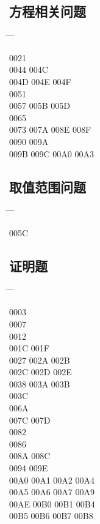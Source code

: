 \documentclass[twoside, twocolumn]{ctexart}
\newenvironment{problist}{
  \begin{center} \ttfamily \begin{tabbing}
      \hspace{50pt} \= \hspace{50pt} \= \hspace{50pt} \= \kill
  }{ \end{tabbing} \end{center} }
\begin{document}
  \subsection*{方程相关问题}

  \begin{problist}
    0021    \\ 0044   \> 004C \\
    004D \> 004E \> 004F  \\ 0051    \\
    0057 \> 005B \> 005D  \\ 0065    \\
    0073 \> 007A \> 008E \> 008F \\ 0090   \> 009A \\
    009B \> 009C \> 00A0 \> 00A3 \\
  \end{problist}

  \subsection*{取值范围问题}

  \begin{problist}
    005C   \\
  \end{problist}

  \subsection*{证明题}

  \begin{problist}
    0003    \\ 0007    \\
    0012    \\ 001C \> 001F   \\
    0027  \> 002A \> 002B \\ 002C \> 002D \> 002E  \\
    0038  \> 003A \> 003B \\ 003C    \\
    006A    \\ 007C \> 007D   \\
    0082    \\ 0086    \\
    008A \> 008C   \\ 0094   \> 009E \\
    00A0 \> 00A1 \> 00A2 \> 00A4 \\ 00A5 \> 00A6 \> 00A7 \> 00A9 \\
    00AE \> 00B0 \> 00B1 \> 00B4 \\ 00B5 \> 00B6 \> 00B7 \> 00B8 \\
  \end{problist}
\end{document}
